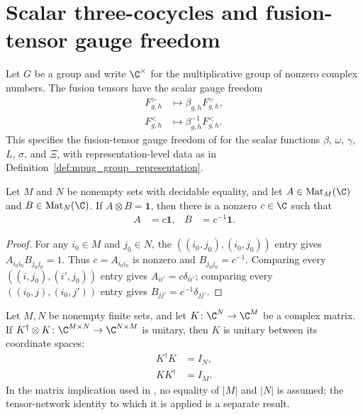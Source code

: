 \section{Scalar three-cocycles and fusion-tensor gauge freedom}
\label{sec:mpug_scalar_gauge}

Let $G$ be a group and write $\C^\times$ for the multiplicative group of
nonzero complex numbers. The fusion tensors have the scalar gauge freedom
\begin{align}
    F^>_{g,h} & \longmapsto \beta_{g,h}F^>_{g,h},      \\
    F^<_{g,h} & \longmapsto \beta_{g,h}^{-1}F^<_{g,h}.
    \label{eq:mpug_fusion_gauge}
\end{align}
This specifies the fusion-tensor gauge freedom of \cite{FrancoRubio2025MPUGauging}
for the scalar functions $\beta$, $\omega$, $\gamma$, $L$, $\sigma$, and $\Xi$,
with representation-level data as in
Definition~\ref{def:mpug_group_representation}.

\begin{lemma}
    \label{thm:mpug_kronecker_identity_factors}
    \leanok
    Let $M$ and $N$ be nonempty sets with decidable equality, and let
    $A\in\operatorname{Mat}_M(\C)$ and $B\in\operatorname{Mat}_N(\C)$. If
    $A\otimes B=\mathbf 1$, then there is a nonzero $c\in\C$ such that
    \begin{align}
        A & =c\mathbf 1, & B & =c^{-1}\mathbf 1.
        \label{eq:mpug_kronecker_identity_factors}
    \end{align}
\end{lemma}

\begin{proof}\leanok
    For any $i_0\in M$ and $j_0\in N$, the
    $((i_0,j_0),(i_0,j_0))$ entry gives
    $A_{i_0i_0}B_{j_0j_0}=1$. Thus $c=A_{i_0i_0}$ is nonzero and
    $B_{j_0j_0}=c^{-1}$. Comparing every
    $((i,j_0),(i',j_0))$ entry gives $A_{ii'}=c\delta_{ii'}$; comparing every
    $((i_0,j),(i_0,j'))$ entry gives $B_{jj'}=c^{-1}\delta_{jj'}$.
\end{proof}

\begin{lemma}
    \label{thm:matrix_unitary_adjoint_kronecker}
    \leanok
    Let $M,N$ be nonempty finite sets, and let
    $K\colon\C^N\to\C^M$ be a complex matrix. If
    $K^\dagger\otimes K\colon\C^{M\times N}\to\C^{N\times M}$
    is unitary, then $K$ is unitary between its coordinate spaces:
    \begin{align}
        K^\dagger K & =I_N, \\
        KK^\dagger  & =I_M.
    \end{align}
    In the matrix implication used in
    \cite[lines~5444--5487]{FrancoRubio2025MPUGauging}, no equality of
    $|M|$ and $|N|$ is assumed; the tensor-network identity to which it is
    applied is a separate result.
\end{lemma}

